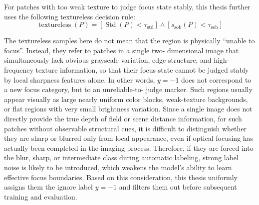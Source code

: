 \par For patches with too weak texture to judge focus state stably, this thesis
further uses the following textureless decision rule:
\begin{equation}
    \operatorname{textureless}(P)=
    \left[\operatorname{Std}(P)<\tau_{\mathrm{std}}\right]
    \land
    \left[s_{\mathrm{sob}}(P)<\tau_{\mathrm{sob}}\right]
    \label{eq:textureless}
\end{equation}
\par The textureless samples here do not mean that the region is physically
``unable to focus''. Instead, they refer to patches in a single two-
dimensional image that simultaneously lack obvious grayscale variation, edge
structure, and high-frequency texture information, so that their focus state
cannot be judged stably by local sharpness features alone. In other words,
$y=-1$ does not correspond to a new focus category, but to an unreliable-to-
judge marker. Such regions usually appear visually as large nearly uniform
color blocks, weak-texture backgrounds, or flat regions with very small
brightness variation. Since a single image does not directly provide the true
depth of field or scene distance information, for such patches without
observable structural cues, it is difficult to distinguish whether they are
sharp or blurred only from local appearance, even if optical focusing has
actually been completed in the imaging process. Therefore, if they are forced
into the blur, sharp, or intermediate class during automatic labeling, strong
label noise is likely to be introduced, which weakens the model's ability to
learn effective focus boundaries. Based on this consideration, this thesis
uniformly assigns them the ignore label $y=-1$ and filters them out before
subsequent training and evaluation.

